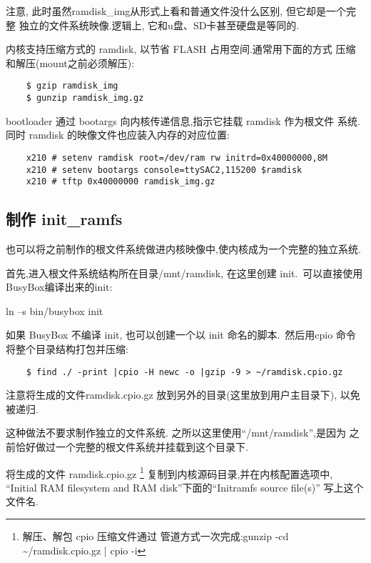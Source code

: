 	注意, 此时虽然ramdisk\_img从形式上看和普通文件没什么区别, 但它却是一个完整
独立的文件系统映像.逻辑上, 它和u盘、SD卡甚至硬盘是等同的.

	内核支持压缩方式的 ramdisk, 以节省 FLASH 占用空间.通常用下面的方式
压缩和解压(mount之前必须解压):

\begin{boxedminipage}{.9\textwidth}
\begin{verbatim}
	$ gzip ramdisk_img
	$ gunzip ramdisk_img.gz
\end{verbatim}
\end{boxedminipage}

	bootloader 通过 bootargs 向内核传递信息,指示它挂载 ramdisk 作为根文件
系统.同时 ramdisk 的映像文件也应装入内存的对应位置:

\begin{boxedminipage}{.9\textwidth}
\begin{verbatim}
	x210 # setenv ramdisk root=/dev/ram rw initrd=0x40000000,8M
	x210 # setenv bootargs console=ttySAC2,115200 $ramdisk
	x210 # tftp 0x40000000 ramdisk_img.gz
\end{verbatim}
\end{boxedminipage}

\subsection{制作 init\_ramfs}
	也可以将之前制作的根文件系统做进内核映像中,使内核成为一个完整的独立系统.

	首先,进入根文件系统结构所在目录/mnt/ramdisk, 在这里创建 init.~可以直接使用
BusyBox编译出来的init:

   ln --s bin/busybox init

如果 BusyBox 不编译 init, 也可以创建一个以 init 命名的脚本.~然后用cpio 命令
将整个目录结构打包并压缩:

\begin{boxedminipage}{.9\textwidth}
\begin{verbatim}
	$ find ./ -print |cpio -H newc -o |gzip -9 > ~/ramdisk.cpio.gz
\end{verbatim}
\end{boxedminipage}

    注意将生成的文件ramdisk.cpio.gz 放到另外的目录(这里放到用户主目录下),
    以免被递归.

	这种做法不要求制作独立的文件系统. 之所以这里使用``/mnt/ramdisk'',是因为
之前恰好做过一个完整的根文件系统并挂载到这个目录下.

	将生成的文件 ramdisk.cpio.gz \footnote{解压、解包 cpio 压缩文件通过
管道方式一次完成:gunzip -cd ~ \~{}/ramdisk.cpio.gz | cpio -i}
复制到内核源码目录,并在内核配置选项中,
``Initial RAM filesystem and RAM disk''下面的``Initramfs source file(s)''
写上这个文件名.

